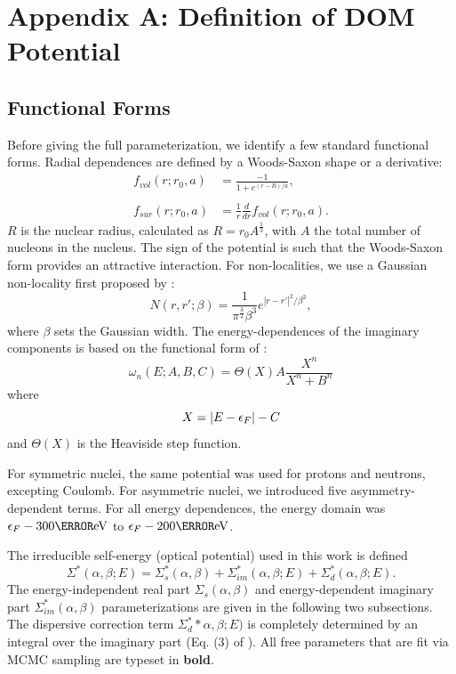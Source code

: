 \documentclass[twocolumn,secnumarabic,amssymb, nobibnotes, aps, prl,
superscriptaddress, nobalancelastpage]{revtex4}
\begin{document}
\clearpage
\appendix \label{DOMFunctionalForms}
\section{Appendix A: Definition of DOM Potential}
\subsection{Functional Forms}
Before giving the full parameterization, we identify a few standard functional
forms. Radial dependences are defined by a Woods-Saxon shape or a derivative:
\begin{equation} \label{WoodsSaxon}
    \begin{split}
        f_{vol}(r; r_{0}, a) & = \frac{-1}{1+e^{(r-R)/a}},\\
        \\
        f_{sur}(r; r_{0}, a) & = \frac{1}{r}\frac{d}{dr}f_{vol}(r; r_{0}, a).
    \end{split}
\end{equation}
$R$ is the nuclear radius, calculated as $R = r_{0}A^{\frac{1}{3}}$, with $A$ the total number of
nucleons in the nucleus. The sign of the potential is such that the Woods-Saxon form
provides an attractive interaction. For non-localities, we use a Gaussian
non-locality first proposed by \cite{Perey1962}:
\begin{equation}
    N(r, r';\beta) = \frac{1}{\pi^{\frac{3}{2}}\beta^{3}}
    e^{|r-r'|^{2}/{\beta^{2}}},
\end{equation}
where $\beta$ sets the Gaussian width.
The energy-dependences of the imaginary components is based on the functional form of \cite{Charity2006}:
\begin{equation} \label{omega}
    \omega_{n}(E; A, B, C) = \Theta(X)A\frac{X^{n}}{X^{n}+B^{n}}
\end{equation}
where
\begin{equation*}
    X = |E-\epsilon_{F}|-C\\
\end{equation*}
and $\Theta(X)$ is the Heaviside step function. 

For symmetric nuclei, the same potential was used for protons and neutrons,
excepting Coulomb. For asymmetric nuclei, we introduced five asymmetry-dependent terms.
For all energy dependences, the energy domain was $\epsilon_{F}-300
\mega\electronvolt$ to $\epsilon_{F}-200 \mega\electronvolt$.

The irreducible self-energy (optical potential) used in this work is defined
\begin{equation} \label{SelfEnergyBreakdown}
    \Sigma^{*}(\alpha,\beta;E) =  \Sigma_{s}^{*}(\alpha,\beta) + \Sigma_{im}^{*}(\alpha,\beta;E)
    + \Sigma_{d}^{*}(\alpha,\beta;E).
\end{equation}
The energy-independent real part $\Sigma_{s}(\alpha,\beta)$ and 
energy-dependent imaginary part $\Sigma_{im}^{*}(\alpha,\beta)$
parameterizations are given in the following two subsections. The
dispersive correction term $\Sigma_{d}^{*}*\alpha,\beta;E)$ is completely
determined by an integral over the imaginary part (Eq. (3) of
\cite{Mahzoon2014}). All free parameters that are fit via MCMC sampling are
typeset in \textbf{bold}.
\end{document}
